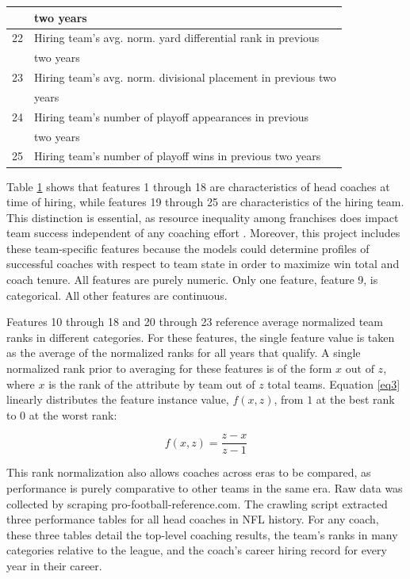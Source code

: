 \documentclass[conference]{IEEEtran}
\begin{document}
\begin{table}[htbp]
\begin{center}
\begin{tabular}{|c||l|}
& two years \\
\hline
22 & Hiring team’s avg. norm. yard differential rank in previous\\
&two years \\
\hline
23 & Hiring team’s avg. norm. divisional placement in previous two\\
&years \\
\hline
24 & Hiring team’s number of playoff appearances in previous\\
&two years \\
\hline
25 & Hiring team’s number of playoff wins in previous two years \\
\hline
\end{tabular}
\label{tab1}
\end{center}
\end{table}

Table \ref{tab1} shows that features 1 through 18 are characteristics of head coaches at time of hiring, while features 19 through 25 are characteristics of the hiring team. This distinction is essential, as resource inequality among franchises does impact team success independent of any coaching effort \cite{b6}. Moreover, this project includes these team-specific features because the models could determine profiles of successful coaches with respect to team state in order to maximize win total and coach tenure. All features are purely numeric. Only one feature, feature 9, is categorical. All other features are continuous.

Features 10 through 18 and 20 through 23 reference average normalized team ranks in different categories. For these features, the single feature value is taken as the average of the normalized ranks for all years that qualify. A single normalized rank prior to averaging for these features is of the form $x \text{ out of }z$, where $x$ is the rank of the attribute by team out of $z$ total teams. Equation \eqref{eq3} linearly distributes the feature instance value, $f(x,z)$, from $1$ at the best rank to $0$ at the worst rank:

\begin{equation}
        f(x,z) = \frac{z-x}{z-1}
        \label{eq3}
\end{equation}

This rank normalization also allows coaches across eras to be compared, as performance is purely comparative to other teams in the same era. Raw data was collected by scraping pro-football-reference.com. The crawling script extracted three performance tables for all head coaches in NFL history. For any coach, these three tables detail the top-level coaching results, the team's ranks in many categories relative to the league, and the coach's career hiring record for every year in their career. 
\end{document}
